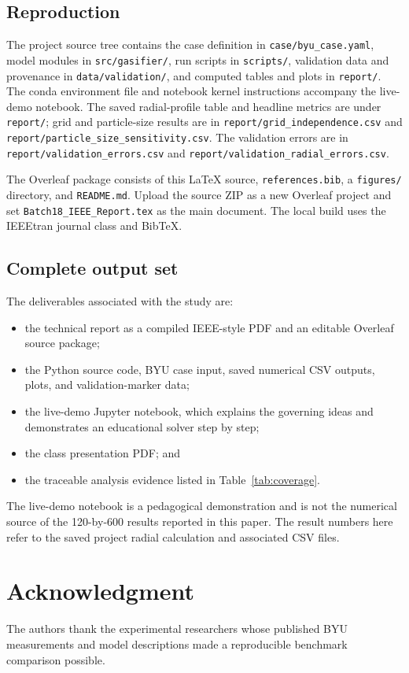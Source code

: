 \documentclass[journal]{IEEEtran}
\begin{document}
\subsection{Reproduction}
The project source tree contains the case definition in \texttt{case/byu\_case.yaml}, model modules in \texttt{src/gasifier/}, run scripts in \texttt{scripts/}, validation data and provenance in \texttt{data/validation/}, and computed tables and plots in \texttt{report/}. The conda environment file and notebook kernel instructions accompany the live-demo notebook. The saved radial-profile table and headline metrics are under \texttt{report/}; grid and particle-size results are in \texttt{report/grid\_independence.csv} and \texttt{report/particle\_size\_sensitivity.csv}. The validation errors are in \texttt{report/validation\_errors.csv} and \texttt{report/validation\_radial\_errors.csv}.

The Overleaf package consists of this \LaTeX{} source, \texttt{references.bib}, a \texttt{figures/} directory, and \texttt{README.md}. Upload the source ZIP as a new Overleaf project and set \texttt{Batch18\_IEEE\_Report.tex} as the main document. The local build uses the IEEEtran journal class and BibTeX.

\subsection{Complete output set}
The deliverables associated with the study are:
\begin{itemize}
  \item the technical report as a compiled IEEE-style PDF and an editable Overleaf source package;
  \item the Python source code, BYU case input, saved numerical CSV outputs, plots, and validation-marker data;
  \item the live-demo Jupyter notebook, which explains the governing ideas and demonstrates an educational solver step by step;
  \item the class presentation PDF; and
  \item the traceable analysis evidence listed in Table~\ref{tab:coverage}.
\end{itemize}
The live-demo notebook is a pedagogical demonstration and is not the numerical source of the 120-by-600 results reported in this paper. The result numbers here refer to the saved project radial calculation and associated CSV files.

\section*{Acknowledgment}
The authors thank the experimental researchers whose published BYU measurements and model descriptions made a reproducible benchmark comparison possible.

\balance


\end{document}
